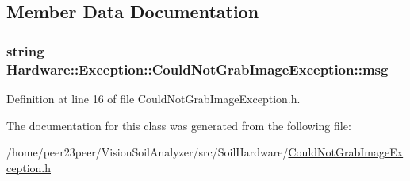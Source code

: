 \subsection{Member Data Documentation}
\hypertarget{class_hardware_1_1_exception_1_1_could_not_grab_image_exception_a3fe61759aec4ce332a968f49ced6b12a}{}
\subsubsection[{msg}]{\setlength{\rightskip}{0pt plus 5cm}string Hardware\+::\+Exception\+::\+Could\+Not\+Grab\+Image\+Exception\+::msg\hspace{0.3cm}{\ttfamily [private]}}\label{class_hardware_1_1_exception_1_1_could_not_grab_image_exception_a3fe61759aec4ce332a968f49ced6b12a}


Definition at line 16 of file Could\+Not\+Grab\+Image\+Exception.\+h.



The documentation for this class was generated from the following file\+:\begin{DoxyCompactItemize}
\item 
/home/peer23peer/\+Vision\+Soil\+Analyzer/src/\+Soil\+Hardware/\hyperlink{_could_not_grab_image_exception_8h}{Could\+Not\+Grab\+Image\+Exception.\+h}\end{DoxyCompactItemize}
